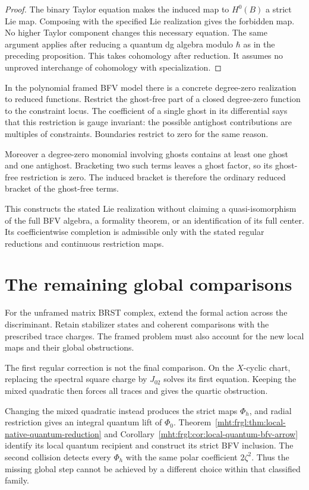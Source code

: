 \begin{proof}
The binary Taylor equation makes the induced map to $H^0(B)$ a
strict Lie map. Composing with the specified Lie realization gives
the forbidden map. No higher Taylor component changes this necessary
equation. The same argument applies after reducing a quantum dg
algebra modulo $\hbar$ as in the preceding proposition. This takes
cohomology after reduction. It assumes no unproved interchange of
cohomology with specialization.
\end{proof}

In the polynomial framed BFV model there is a concrete degree-zero
realization to reduced functions. Restrict the ghost-free part of a
closed degree-zero function to the constraint locus. The coefficient
of a single ghost in its differential says that this restriction is
gauge invariant: the possible antighost contributions are multiples
of constraints. Boundaries restrict to zero for the same reason.

Moreover a degree-zero monomial involving ghosts contains at least
one ghost and one antighost. Bracketing two such terms leaves a ghost
factor, so its ghost-free restriction is zero. The induced bracket is
therefore the ordinary reduced bracket of the ghost-free terms.

This constructs the stated Lie realization without claiming a
quasi-isomorphism of the full BFV algebra, a formality theorem, or an
identification of its full center. Its coefficientwise completion is
admissible only with the stated regular reductions and continuous
restriction maps.
\section{The remaining global comparisons}
\label{mht:frgl:sec:remaining}

For the unframed matrix BRST complex, extend the formal action
across the discriminant. Retain stabilizer states and coherent
comparisons with the prescribed trace charges.
The framed problem must also account for the new local maps and
their global obstructions.

The first regular correction is not the final comparison. On the
$X$-cyclic chart, replacing the spectral square charge by $J_{02}$ solves
its first equation. Keeping the mixed quadratic then forces all traces
and gives the quartic obstruction.

Changing the mixed quadratic instead
produces the strict maps $\Phi_h$, and radial restriction gives an
integral quantum lift of $\Phi_0$. Theorem~\ref{mht:frgl:thm:local-native-quantum-reduction}
and Corollary~\ref{mht:frgl:cor:local-quantum-bfv-arrow} identify its local quantum
recipient and construct its strict BFV inclusion. The second collision detects every
$\Phi_h$ with the same polar coefficient $2\zeta^2$. Thus the missing
global step cannot be achieved by a different choice within that
classified family.

